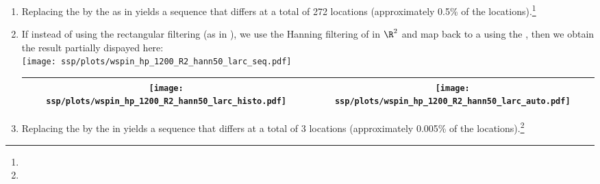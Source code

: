 \begin{example}
\begin{enumerate}
  \item \label{item:wspin_hp_rect50_R2_euclid}
        Replacing the  by the  as in 
        yields a sequence that differs at a total of 272 locations 
        (approximately 0.5\% of the locations).\footnote{} %

  \item \label{item:wspin_hp_hann50_R2_larc}
        If instead of using the rectangular filtering (as in ),
        we use the Hanning filtering of 
        in $\R^2$ and map back to a  using the ,
        then we obtain the result partially dispayed here:
        \\\texttt{[image: ssp/plots/wspin\_hp\_1200\_R2\_hann50\_larc\_seq.pdf]}
        \\\begin{tabular}{|>{\scs}c|>{\scs}c|}
             \hline
             \texttt{[image: ssp/plots/wspin\_hp\_1200\_R2\_hann50\_larc\_histo.pdf]}
            &\texttt{[image: ssp/plots/wspin\_hp\_1200\_R2\_hann50\_larc\_auto.pdf]}
           \\\hline
        \end{tabular}

  \item \label{item:wspin_hp_hann50_R2_euclid}
        Replacing the  by the  in 
        yields a sequence that differs at a total of 3 locations 
        (approximately 0.005\% of the locations).\footnote{} %
\end{enumerate}
\end{example}




